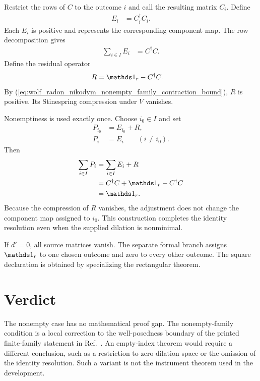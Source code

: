 \documentclass{article}
\begin{document}
Restrict the rows of $C$ to the outcome $i$ and call the resulting matrix
$C_i$. Define
\begin{align}
    E_i&=C_i^\dagger C_i.
    \label{eq:wolf_radon_nikodym_nonempty_family_preliminary_effect}
\end{align}
Each $E_i$ is positive and represents the corresponding component map. The
row decomposition gives
\begin{align}
    \sum_{i\in I}E_i
        &=C^\dagger C.
    \label{eq:wolf_radon_nikodym_nonempty_family_preliminary_effect_sum}
\end{align}
Define the residual operator
\begin{align}
    R&=\Id_r-C^\dagger C.
    \label{eq:wolf_radon_nikodym_nonempty_family_residual_definition}
\end{align}
By (\ref{eq:wolf_radon_nikodym_nonempty_family_contraction_bound}), $R$ is
positive. Its Stinespring compression under $V$ vanishes.

Nonemptiness is used exactly once. Choose $i_0\in I$ and set
\begin{align}
    P_{i_0}&=E_{i_0}+R,
    \label{eq:wolf_radon_nikodym_nonempty_family_corrected_effect}\\
    P_i&=E_i\qquad(i\neq i_0).
    \label{eq:wolf_radon_nikodym_nonempty_family_unchanged_effects}
\end{align}
Then
\begin{align}
    \sum_{i\in I}P_i
        &=\sum_{i\in I}E_i+R
    \label{eq:wolf_radon_nikodym_nonempty_family_completed_sum_first}\\
        &=C^\dagger C+\Id_r-C^\dagger C
    \label{eq:wolf_radon_nikodym_nonempty_family_completed_sum_second}\\
        &=\Id_r.
    \label{eq:wolf_radon_nikodym_nonempty_family_completed_resolution}
\end{align}
Because the compression of $R$ vanishes, the adjustment does not change the
component map assigned to $i_0$. This construction completes the identity
resolution even when the supplied dilation is nonminimal.

If $d'=0$, all source matrices vanish. The separate formal branch assigns
$\Id_r$ to one chosen outcome and zero to every other outcome. The square
declaration is obtained by specializing the rectangular theorem.

\section{Verdict}

The nonempty case has no mathematical proof gap. The nonempty-family condition
is a local correction to the well-posedness boundary of the printed
finite-family statement in Ref.~\cite{Wolf2012Quantum}. An empty-index theorem
would require a different conclusion, such as a restriction to zero dilation
space or the omission of the identity resolution. Such a variant is not the
instrument theorem used in the development.



\end{document}
